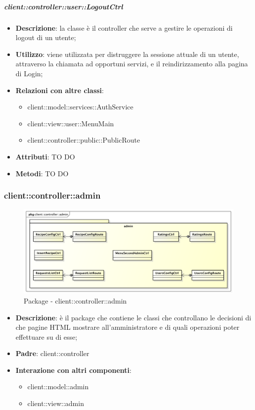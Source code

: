 		\subparagraph{client::controller::user::LogoutCtrl} %
		\label{subp:bdsm_app_client_controller_user_logoutctrl}
			\begin{itemize}
				\item \textbf{Descrizione}: la classe è il controller che serve a gestire le operazioni di logout di un utente;
				\item \textbf{Utilizzo}: viene utilizzata per distruggere la sessione attuale di un utente, attraverso la chiamata ad opportuni servizi, e il reindirizzamento alla pagina di Login;
				\item \textbf{Relazioni con altre classi}:
					\begin{itemize}
						\item client::model::services::AuthService
						\item client::view::user::MenuMain
						\item client::controller::public::PublicRoute
					\end{itemize}
				\item \textbf{Attributi}: TO DO
				\item \textbf{Metodi}: TO DO
			\end{itemize}



\subsubsection{client::controller::admin} %
\label{ssub:bdsm_app_client_controller_admin}
\begin{figure}[htbp]
	\centering
	\centerline{\includegraphics[scale=0.45]{./images/client/client_controller_admin.pdf}}
	\caption{Package - client::controller::admin}
\end{figure}

\begin{itemize}
	\item \textbf{Descrizione}: è il package che contiene le classi che controllano le decisioni di che pagine HTML mostrare all'amministratore e di quali operazioni poter effettuare su di esse;
	\item \textbf{Padre}: client::controller
	\item \textbf{Interazione con altri componenti}:
		\begin{itemize}
			\item client::model::admin
			\item client::view::admin
		\end{itemize}
\end{itemize}


